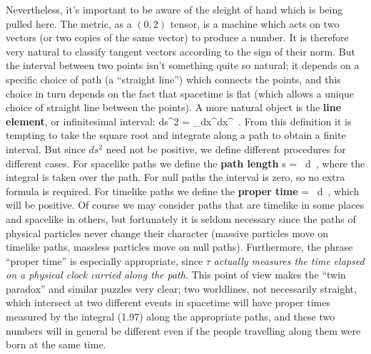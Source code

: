 \documentclass[12pt]{article}
\begin{document}
Nevertheless, it's important to be aware of the sleight of hand which is 
being pulled here.  The metric, as a $(0,2)$ tensor, is a machine which 
acts on two vectors (or two copies of the same vector) to produce a number.
It is therefore very natural to classify tangent vectors according to
the sign of their norm.  But the interval between two points isn't
something quite so natural; it depends on a specific choice of path
(a ``straight line'') which connects the points, and this choice in
turn depends on the fact that spacetime is flat (which allows a 
unique choice of straight line between the points).  A more natural
object is the {\bf line element}, or infinitesimal interval:
\be
  ds^2 = \eta_\mn dx^\mu dx^\nu\ .\label{1.95}
\ee
From this definition it is tempting to take the square root and
integrate along a path to obtain a finite interval.  But since $ds^2$
need not be positive, we define different procedures for different
cases.  For spacelike paths we define the {\bf path length}
\be
  \Delta s = \int {}\ d\lambda\ ,\label{1.96}
\ee
where the integral is taken over the path.  For null paths the interval
is zero, so no extra formula is required.  For timelike paths we define
the {\bf proper time}
\be
  \Delta \tau = \int {}\ d\lambda\ ,\label{1.97}
\ee
which will be positive.  Of course we may consider paths that are
timelike in some places and spacelike in others, but fortunately
it is seldom necessary since the paths of physical particles never
change their character (massive particles move on timelike paths,
massless particles move on null paths).  Furthermore, the phrase
``proper time'' is especially appropriate, since $\tau$ {\it actually
measures the time elapsed on a physical clock carried along the path}.
This point of view makes the ``twin paradox'' and similar puzzles
very clear; two worldlines, not necessarily straight, which intersect at 
two different events in spacetime will have proper times measured by the
integral (1.97) along the appropriate paths, and these two numbers will
in general be different even if the people travelling along them were
born at the same time.
\end{document}
